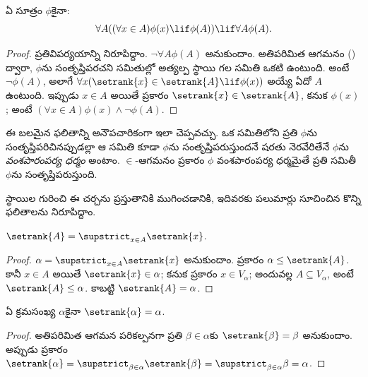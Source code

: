 \documentclass[../../../include/open-logic-section]{subfiles}
\begin{document}
\begin{thm}
ఏ సూత్రం $\phi$కైనా:
\[
	\forall A((\forall x \in A)\phi(x) \lif \phi(A)) \lif \forall A \phi(A).
\]
\end{thm}

\begin{proof}
ప్రతివిపర్యయాన్ని నిరూపిద్దాం. $\lnot \forall A
\phi(A)$ అనుకుందాం. అతిపరిమిత ఆగమనం () ద్వారా, $\phi$ను సంతృప్తిపరచని సమితుల్లో అత్యల్ప స్థాయి గల
సమితి ఒకటి ఉంటుంది. అంటే $\lnot \phi(A)$, అలాగే $\forall x(\setrank{x} \in \setrank{A}
\lif \phi(x))$ అయ్యే ఏదో $A$ ఉంటుంది. ఇప్పుడు $x \in A$ అయితే  ప్రకారం $\setrank{x} \in
\setrank{A}$, కనుక $\phi(x)$; అంటే $(\forall x \in
A)\phi(x) \land \lnot \phi(A)$.
\end{proof}\noindent ఈ బలమైన ఫలితాన్ని అనౌపచారికంగా ఇలా చెప్పవచ్చు. ఒక సమితిలోని
ప్రతి  $\phi$ను సంతృప్తిపరిచినప్పుడల్లా
ఆ సమితి కూడా $\phi$ను సంతృప్తిపరుస్తుందనే షరతు నెరవేరితేనే $\phi$ను
\emph{వంశపారంపర్య ధర్మం} అంటాం. $\in$-ఆగమనం ప్రకారం
$\phi$ వంశపారంపర్య ధర్మమైతే ప్రతి సమితీ $\phi$ను సంతృప్తిపరుస్తుంది.

స్థాయిల గురించి ఈ చర్చను ప్రస్తుతానికి ముగించడానికి, ఇదివరకు పలుమార్లు
సూచించిన కొన్ని ఫలితాలను నిరూపిద్దాం.

\begin{prop}
$\setrank{A} = \supstrict_{x \in A}\setrank{x}$.
\end{prop}

\begin{proof}
$\alpha = \supstrict_{x \in A}\setrank{x}$ అనుకుందాం.  ప్రకారం $\alpha \leq \setrank{A}$. కానీ $x \in A$ అయితే $\setrank{x} \in \alpha$; కనుక  ప్రకారం $x \in V_\alpha$; అందువల్ల $A
\subseteq V_\alpha$, అంటే $\setrank{A} \leq \alpha$. కాబట్టి $\setrank{A} = \alpha$.
\end{proof}

\begin{cor}
ఏ క్రమసంఖ్య $\alpha$కైనా $\setrank{\alpha} = \alpha$.
\end{cor}

\begin{proof}
అతిపరిమిత ఆగమన పరికల్పనగా ప్రతి $\beta \in \alpha$కు $\setrank{\beta} = \beta$ అనుకుందాం. అప్పుడు  ప్రకారం $\setrank{\alpha} = \supstrict_{\beta \in
\alpha}\setrank{\beta} = \supstrict_{\beta \in \alpha}\beta = \alpha$.
%
\end{proof}
\end{document}
